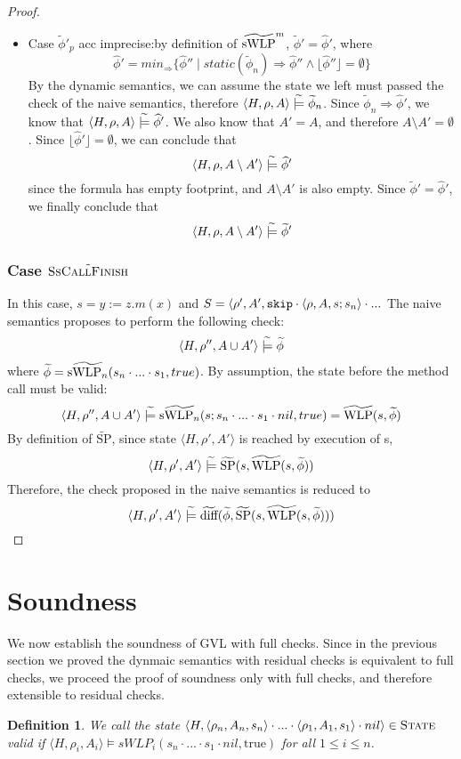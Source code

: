 \documentclass {article}
\newtheorem{definition}[theorem]{Definition}
\newcommand{\true}{\text{true}}
\newcommand{\fphi}{\widehat{\phi}}
\newcommand{\tphi}{\widetilde{\phi}}
\newcommand{\imp}{\Rightarrow}
\newcommand{\consistent}{\models}
\newcommand{\tconsistent}{\hspace{1mm}\widetilde{\models}\hspace{1mm}}
\newcommand{\twlp}[2]{\widetilde{\textup{WLP}}(#1,#2)}
\newcommand{\tswlpn}[2]{\widetilde{\textup{sWLP}_n}(#1,#2)}
\newcommand{\tsp}[2]{\widetilde{\textup{SP}}(#1,#2)}
\newcommand{\tdiff}[2]{\widetilde{\textup{diff}}(#1,#2)}
\begin{document}
\begin{proof}
\begin{enumerate}
\begin{itemize}
	\item Case $\tphi'_p$ acc imprecise:by definition of $\widetilde{\textup{sWLP}}^m$, $\tphi' = \fphi'$, where $$\fphi' = min_{\imp}\{\fphi'' \mid static(\tphi_n) \imp \fphi'' \wedge \lfloor \fphi'' \rfloor = \emptyset\}$$ By the dynamic semantics, we can assume the state we left must passed the check of the naive semantics, therefore $\langle H, \rho, A \rangle \tconsistent \tphi_n$. Since $\tphi_n \imp \fphi'$, we know that $\langle H, \rho, A \rangle \tconsistent \fphi'$. We also know that $A' = A$, and therefore $A \setminus A' = \emptyset$. Since $\lfloor \fphi' \rfloor = \emptyset$, we can conclude that $$\langle H, \rho, A \setminus A'\rangle \tconsistent \fphi'$$ since the formula has empty footprint, and $A \setminus A'$ is also empty. Since $\tphi' = \fphi'$, we finally conclude that $$\langle H, \rho, A \setminus A'\rangle \tconsistent \tphi'$$

\end{itemize}
\end{enumerate}


\subsubsection*{Case $\tilde{\textsc{SsCallFinish}}$}
In this case, $s = y:=z.m(x)$ and $S =\langle \rho', A', \textup{\texttt{skip}} \cdot \langle \rho, A, s; s_n\rangle \cdot ...$ The naive semantics proposes to perform the following check: 
$$\langle H, \rho'', A \cup A' \rangle \tconsistent \tphi$$ where $\tphi =\tswlpn{s_n \cdot ... \cdot s_1}{true}$. 
By assumption, the state before the method call must be valid: $$\langle H, \rho'', A \cup A' \rangle \tconsistent \tswlpn{s;s_n \cdot ... \cdot s_1 \cdot nil}{ true} = \twlp{s}{\tphi}$$ By definition of $\widetilde{\text{SP}}$, since state $\langle H, \rho', A' \rangle$ is reached by execution of s, $$\langle H, \rho', A' \rangle  \tconsistent \tsp{s}{\twlp{s}{\tphi}}$$ Therefore, the check proposed in the naive semantics is reduced to  $$\langle H, \rho', A' \rangle  \tconsistent \tdiff{\tphi}{\tsp{s}{\twlp{s}{\tphi}}}$$


\end{proof}

\section{Soundness}
We now establish the soundness of GVL with full checks. Since in the previous section we proved the dynmaic semantics with residual checks is equivalent to full checks, we proceed the proof of soundness only with full checks, and therefore extensible to residual checks.
\vspace*{5mm}
\begin{definition}
We call the state $\langle H, \langle \rho_n, A_n, s_n \rangle \cdot ... \cdot \langle \rho_1, A_1, s_1 \rangle \cdot nil \rangle \in \textsc{State}$ valid if $\langle H, \rho_i, A_i \rangle \consistent sWLP_i(s_n\cdot ... \cdot s_1 \cdot nil, \true)$ for all $1 \leq i \leq n$.
\end{definition}
\vspace*{5mm}
\end{document}
